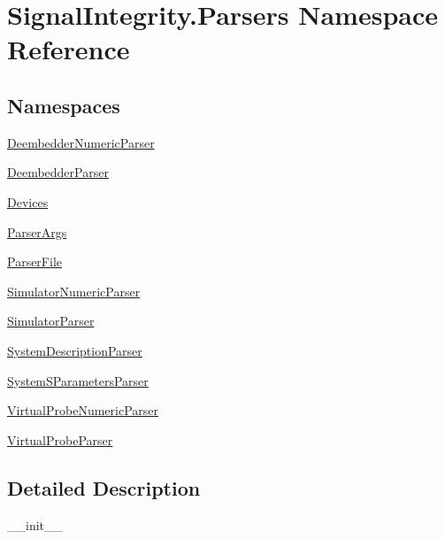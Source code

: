 \hypertarget{namespaceSignalIntegrity_1_1Parsers}{}\section{Signal\+Integrity.\+Parsers Namespace Reference}
\label{namespaceSignalIntegrity_1_1Parsers}
\subsection*{Namespaces}
\begin{DoxyCompactItemize}
\item 
 \hyperlink{namespaceSignalIntegrity_1_1Parsers_1_1DeembedderNumericParser}{Deembedder\+Numeric\+Parser}
\item 
 \hyperlink{namespaceSignalIntegrity_1_1Parsers_1_1DeembedderParser}{Deembedder\+Parser}
\item 
 \hyperlink{namespaceSignalIntegrity_1_1Parsers_1_1Devices}{Devices}
\item 
 \hyperlink{namespaceSignalIntegrity_1_1Parsers_1_1ParserArgs}{Parser\+Args}
\item 
 \hyperlink{namespaceSignalIntegrity_1_1Parsers_1_1ParserFile}{Parser\+File}
\item 
 \hyperlink{namespaceSignalIntegrity_1_1Parsers_1_1SimulatorNumericParser}{Simulator\+Numeric\+Parser}
\item 
 \hyperlink{namespaceSignalIntegrity_1_1Parsers_1_1SimulatorParser}{Simulator\+Parser}
\item 
 \hyperlink{namespaceSignalIntegrity_1_1Parsers_1_1SystemDescriptionParser}{System\+Description\+Parser}
\item 
 \hyperlink{namespaceSignalIntegrity_1_1Parsers_1_1SystemSParametersParser}{System\+S\+Parameters\+Parser}
\item 
 \hyperlink{namespaceSignalIntegrity_1_1Parsers_1_1VirtualProbeNumericParser}{Virtual\+Probe\+Numeric\+Parser}
\item 
 \hyperlink{namespaceSignalIntegrity_1_1Parsers_1_1VirtualProbeParser}{Virtual\+Probe\+Parser}
\end{DoxyCompactItemize}


\subsection{Detailed Description}
\begin{DoxyVerb}__init__\end{DoxyVerb}
 
